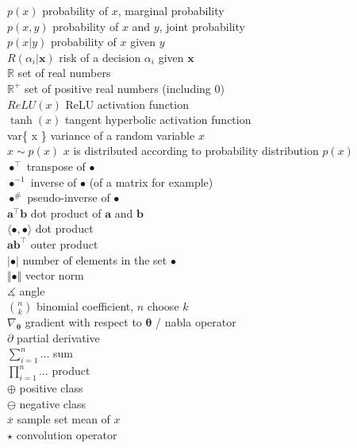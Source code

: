 \documentclass[12pt]{article}
\begin{document}
\begin{tabbing}
	\> $p(x)$										\>	probability of $x$, marginal probability						\\[3mm]
	\> $p(x, y)$									\>	probability of $x$ and $y$, joint probability					\\[3mm]
	\> $p(x \vert y)$								\>	probability of $x$ given $y$								\\[3mm]
	\> $R(\alpha_i \vert \bm{x})$						\>	risk of a decision $\alpha_i$ given $\bm{x}$					\\[3mm]
	\> $\mathbb{R}$								\>	set of real numbers									\\[3mm]
	\> $\mathbb{R}^+$								\>	set of positive real numbers (including 0)						\\[3mm]
	\> $ReLU(x)$									\>	ReLU activation function								\\[3mm]
	\> $\tanh(x)$									\>	tangent hyperbolic activation function						\\[3mm]
	\> var\{ x \}									\>	variance of a random variable $x$							\\[3mm]
	\> $x \sim p(x)$									\>	$x$ is distributed according to probability distribution $p(x)$		\\[3mm]
	\> $\bullet^{\intercal}$							\>	transpose of $\bullet$									\\[3mm]
	\> $\bullet^{-1}$								\>	inverse of $\bullet$ (of a matrix for example)					\\[3mm]
	\> $\bullet^{\#}$								\>	pseudo-inverse of $\bullet$								\\[3mm]
	\> $\bm{a}^{\intercal}\bm{b}$						\>	dot product of $\bm{a}$ and $\bm{b}$						\\[3mm]
	\> $\langle \bullet, \bullet \rangle$					\>	dot product										\\[3mm]
	\> $\bm{a}\bm{b}^{\intercal}$						\>	outer product										\\[3mm]
	\> $\vert \bullet \vert$							\>	number of elements in the set $\bullet$						\\[3mm]
	\> $\Vert \bullet \Vert$							\>	vector norm										\\[3mm]
	\> $\measuredangle$								\>	angle												\\[3mm]
	\> $\binom{n}{k}$								\>	binomial coefficient, $n$ choose $k$						\\[3mm]
	\> $\nabla_{\bm{\theta}}$							\>	gradient with respect to $\bm{\theta}$ / nabla operator			\\[3mm]	
	\> $\partial$									\>	partial derivative										\\[3mm]
	\> $\sum_{i=1}^n \dots$							\>	sum												\\[3mm]
	\> $\prod_{i=1}^n \dots$							\>	product											\\[3mm]
	\> $\oplus$									\>	positive class										\\[3mm]
	\> $\ominus$									\>	negative class										\\[3mm]
	\> $\overline{x}$								\>	sample set mean of $x$								\\[3mm]
	\> $\star$										\>	convolution operator
\end{tabbing}
\end{document}
